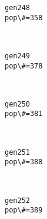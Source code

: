\documentclass[11pt]{article}
\begin{document}
    \begin{Verbatim}[commandchars=\\\{\}]
gen248
pop\#=358

    \end{Verbatim}

    \begin{center}
    \end{center}
    { \hspace*{\fill} \\}
    
    \begin{Verbatim}[commandchars=\\\{\}]
gen249
pop\#=378

    \end{Verbatim}

    \begin{center}
    \end{center}
    { \hspace*{\fill} \\}
    
    \begin{Verbatim}[commandchars=\\\{\}]
gen250
pop\#=381

    \end{Verbatim}

    \begin{center}
    \end{center}
    { \hspace*{\fill} \\}
    
    \begin{Verbatim}[commandchars=\\\{\}]
gen251
pop\#=388

    \end{Verbatim}

    \begin{center}
    \end{center}
    { \hspace*{\fill} \\}
    
    \begin{Verbatim}[commandchars=\\\{\}]
gen252
pop\#=389

    \end{Verbatim}
\end{document}
